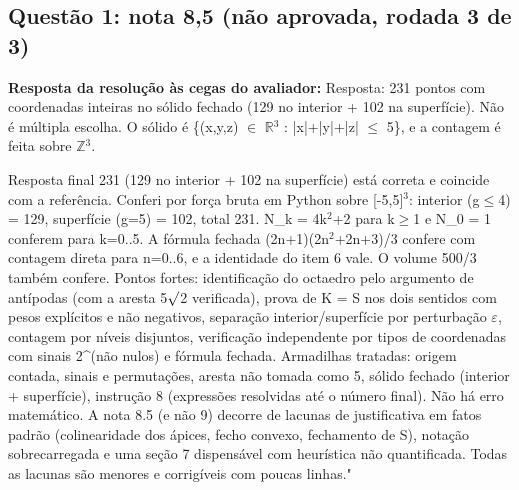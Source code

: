 \documentclass{article}%
\begin{document}
\subsection*{Questão 1: nota 8,5 (não aprovada, rodada 3 de 3)}%
\textbf{Resposta da resolução às cegas do avaliador:} Resposta: 231 pontos com coordenadas inteiras no sólido fechado (129 no interior + 102 na superfície). Não é múltipla escolha. O sólido é \{(x,y,z) $\in$ $\mathbb{R}$$^3$ : |x|+|y|+|z| $\leq$ 5\}, e a contagem é feita sobre $\mathbb{Z}$$^3$.\par %
Resposta final 231 (129 no interior + 102 na superfície) está correta e coincide com a referência. Conferi por força bruta em Python sobre {[}{-}5,5{]}$^3$: interior (g$\leq$4) = 129, superfície (g=5) = 102, total 231. N\_k = 4k$^2$+2 para k$\geq$1 e N\_0 = 1 conferem para k=0..5. A fórmula fechada (2n+1)(2n$^2$+2n+3)/3 confere com contagem direta para n=0..6, e a identidade do item 6 vale. O volume 500/3 também confere. Pontos fortes: identificação do octaedro pelo argumento de antípodas (com a aresta 5$\surd$2 verificada), prova de K = S nos dois sentidos com pesos explícitos e não negativos, separação interior/superfície por perturbação $\varepsilon$, contagem por níveis disjuntos, verificação independente por tipos de coordenadas com sinais 2\^{}(não nulos) e fórmula fechada. Armadilhas tratadas: origem contada, sinais e permutações, aresta não tomada como 5, sólido fechado (interior + superfície), instrução 8 (expressões resolvidas até o número final). Não há erro matemático. A nota 8.5 (e não 9) decorre de lacunas de justificativa em fatos padrão (colinearidade dos ápices, fecho convexo, fechamento de S), notação sobrecarregada e uma seção 7 dispensável com heurística não quantificada. Todas as lacunas são menores e corrigíveis com poucas linhas."%
\end{document}

